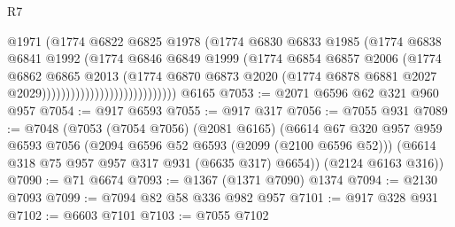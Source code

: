 \begin{lexlean}{R7}
\begin{coremodule}
                                            @1971
                                            (@1774
                                              @6822
                                              @6825
                                              @1978
                                              (@1774
                                                @6830
                                                @6833
                                                @1985
                                                (@1774
                                                  @6838
                                                  @6841
                                                  @1992
                                                  (@1774
                                                    @6846
                                                    @6849
                                                    @1999
                                                    (@1774
                                                      @6854
                                                      @6857
                                                      @2006
                                                      (@1774
                                                        @6862
                                                        @6865
                                                        @2013
                                                        (@1774
                                                          @6870
                                                          @6873
                                                          @2020
                                                          (@1774
                                                            @6878
                                                            @6881
                                                            @2027
                                                            @2029))))))))))))))))))))))))))))
    @6165
@7053 := @2071 @6596 @62 @321 @960 @957
@7054 := @917 @6593
@7055 := @917 @317
@7056 := @7055 @931
@7089 := @7048
    (@7053
      (@7054 @7056)
      (@2081 @6165)
      (@6614
        @67
        @320
        @957
        @959
        @6593
        @7056
        (@2094 @6596 @52 @6593 (@2099 (@2100 @6596 @52)))
        (@6614 @318 @75 @957 @957 @317 @931 (@6635 @317) @6654))
      (@2124 @6163 @316))
@7090 := @71 @6674
@7093 := @1367 (@1371 @7090) @1374
@7094 := @2130 @7093
@7099 := @7094 @82 @58 @336 @982 @957
@7101 := @917 @328 @931
@7102 := @6603 @7101
@7103 := @7055 @7102

\end{coremodule}
\end{lexlean}
